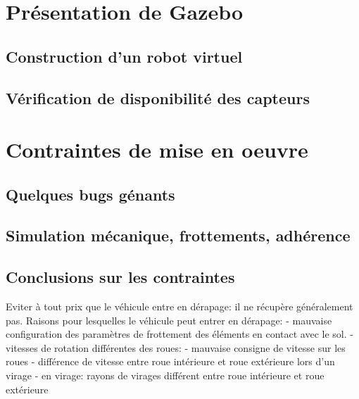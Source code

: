 \documentclass[12pt,a4paper]{report}
\begin{document}
	\section{Présentation de Gazebo}
	
		\subsection{Construction d'un robot virtuel}
		
		
		\subsection{Vérification de disponibilité des capteurs}
		
	\section{Contraintes de mise en oeuvre}
		\subsection{Quelques bugs génants}
		\subsection{Simulation mécanique, frottements, adhérence}
		\subsection{Conclusions sur les contraintes}
		Eviter à tout prix que le véhicule entre en dérapage: il ne récupère généralement pas.
		Raisons pour lesquelles le véhicule peut entrer en dérapage:
			- mauvaise configuration des paramètres de frottement des éléments en contact avec le sol.
			- vitesses de rotation différentes des roues: 
				- mauvaise consigne de vitesse sur les roues
				- différence de vitesse entre roue intérieure et roue extérieure lors d'un virage
			- en virage: rayons de virages différent entre roue intérieure et roue extérieure
			
\end{document}
